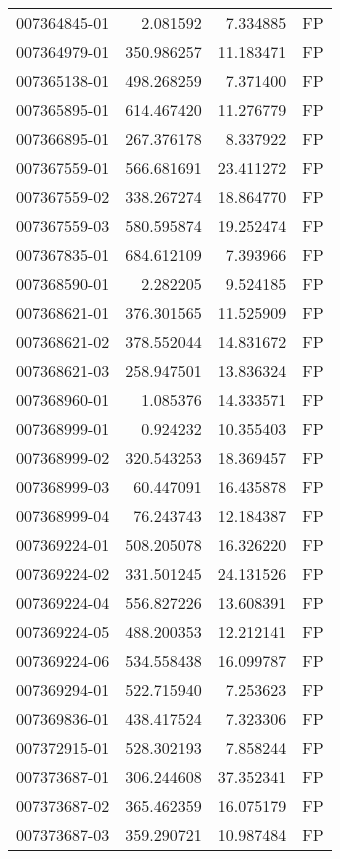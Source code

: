 \begin{tabular}{lrrl}
007364845-01 &    2.081592 &     7.334885 &   FP \\
007364979-01 &  350.986257 &    11.183471 &   FP \\
007365138-01 &  498.268259 &     7.371400 &   FP \\
007365895-01 &  614.467420 &    11.276779 &   FP \\
007366895-01 &  267.376178 &     8.337922 &   FP \\
007367559-01 &  566.681691 &    23.411272 &   FP \\
007367559-02 &  338.267274 &    18.864770 &   FP \\
007367559-03 &  580.595874 &    19.252474 &   FP \\
007367835-01 &  684.612109 &     7.393966 &   FP \\
007368590-01 &    2.282205 &     9.524185 &   FP \\
007368621-01 &  376.301565 &    11.525909 &   FP \\
007368621-02 &  378.552044 &    14.831672 &   FP \\
007368621-03 &  258.947501 &    13.836324 &   FP \\
007368960-01 &    1.085376 &    14.333571 &   FP \\
007368999-01 &    0.924232 &    10.355403 &   FP \\
007368999-02 &  320.543253 &    18.369457 &   FP \\
007368999-03 &   60.447091 &    16.435878 &   FP \\
007368999-04 &   76.243743 &    12.184387 &   FP \\
007369224-01 &  508.205078 &    16.326220 &   FP \\
007369224-02 &  331.501245 &    24.131526 &   FP \\
007369224-04 &  556.827226 &    13.608391 &   FP \\
007369224-05 &  488.200353 &    12.212141 &   FP \\
007369224-06 &  534.558438 &    16.099787 &   FP \\
007369294-01 &  522.715940 &     7.253623 &   FP \\
007369836-01 &  438.417524 &     7.323306 &   FP \\
007372915-01 &  528.302193 &     7.858244 &   FP \\
007373687-01 &  306.244608 &    37.352341 &   FP \\
007373687-02 &  365.462359 &    16.075179 &   FP \\
007373687-03 &  359.290721 &    10.987484 &   FP \\

\end{tabular}
